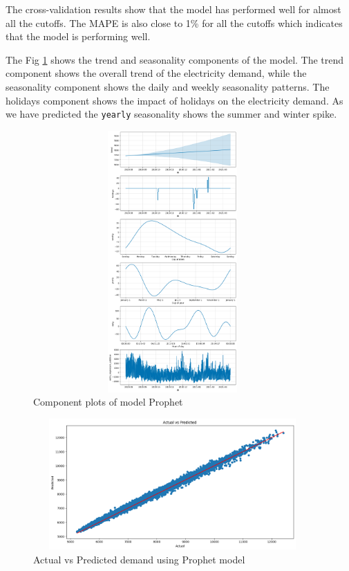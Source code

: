 \documentclass[mstat,12pt]{unswthesis}
\begin{document}
The cross-validation results show that the model has performed well for
almost all the cutoffs. The MAPE is also close to 1\% for all the
cutoffs which indicates that the model is performing well.

The Fig \ref{prophet_component_plot} shows the trend and seasonality
components of the model. The trend component shows the overall trend of
the electricity demand, while the seasonality component shows the daily
and weekly seasonality patterns. The holidays component shows the impact
of holidays on the electricity demand. As we have predicted the
\texttt{yearly} seasonality shows the summer and winter spike.

\begin{figure}[H]
\centering
\includegraphics[width=0.95\textwidth, height=10cm]{prophet_component_plot.png}
\caption{Component plots of model Prophet}\label{prophet_component_plot}
\end{figure}

\begin{figure}[H]
\centering
\includegraphics[width=0.95\textwidth, height=5cm]{prophet_actual_predict.png}
\caption{Actual vs Predicted demand using Prophet model}\label{prophet_actual}
\end{figure}
\end{document}
